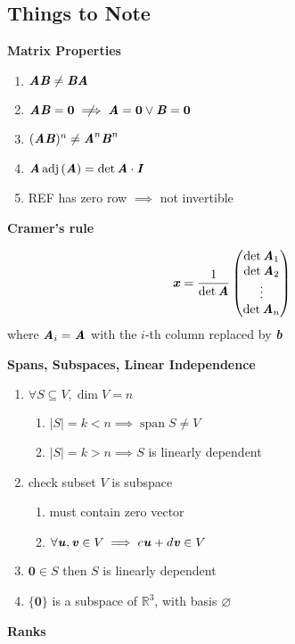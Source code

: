 \documentclass[landscape, a4paper]{article}
\newcommand{\R}{\mathbb{R}}
\newcommand{\V}[1]{\textbf{\textit{#1}}}
\newcommand{\adj}[1]{\operatorname{adj}\left(#1\right)}
\newcommand{\Or}{\vee}
\newcommand{\Span}{\operatorname{span}}
\newcommand{\customsection}[1]{
    \vspace*{-10pt}
    \section*{#1}
}
\newcommand{\heading}[1]{
    \noindent\textbf{#1}
}
\begin{document}
\small
\begin{multicols*}{4}
    \customsection{Things to Note}
    \heading{Matrix Properties}
    \begin{enumerate}
        \item $\V{AB}\neq \V{BA}$
        \item $\V{AB}=\textbf{0}\centernot\implies \V{A}=\textbf{0}\Or \V{B}=\textbf{0}$
        \item $(\V{AB})^n\neq \V{A}^n\V{B}^n$
        \item $\V{A}\adj{\V{A}}=\det{\V{A}}\cdot\V{I}$
        \item REF has zero row $\implies$ not invertible
    \end{enumerate}
    \heading{Cramer's rule}
    $$
        \V{x}=\dfrac{1}{\det\V{A}}\begin{pmatrix}
            \det\V{A}_1 \\
            \det\V{A}_2 \\
            \vdots      \\
            \det\V{A}_n
        \end{pmatrix}
    $$
    where $\V{A}_i=\V{A}$ with the $i$-th column replaced by \V{b}
    \heading{Spans, Subspaces, Linear Independence}
    \begin{enumerate}
        \item $\forall S\subseteq V, \dim V=n$
              \begin{enumerate}
                  \item $|S|=k<n\implies \Span S \neq V$
                  \item $|S|=k>n\implies S$ is linearly dependent
              \end{enumerate}
        \item check subset $V$ is subspace
              \begin{enumerate}
                  \item must contain zero vector
                  \item $\forall \V{u},\V{v}\in V\implies c\V{u}+d\V{v}\in V$
              \end{enumerate}
        \item $\textbf{0}\in S$ then $S$ is linearly dependent
        \item $\{\textbf{0}\}$ is a subspace of $\R^3$, with basis $\varnothing$
    \end{enumerate}
    \heading{Ranks}
    \begin{enumerate}

\end{enumerate}
\end{multicols*}
\end{document}

